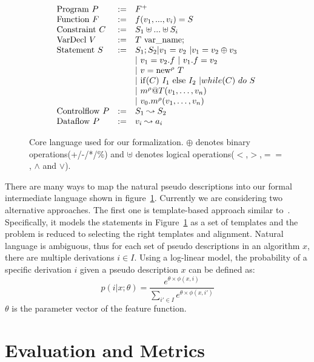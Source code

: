 \documentclass[11pt]{article}
\begin{document}
 \begin{figure}[t]
 \small
\[
\begin{array}{lll}
{\rm Program} \ P & := & F^+ \\
{\rm Function} \ F & := &  f(v_1,...,v_i) = S \\
{\rm Constraint} \ C & := & S_1 \uplus ... \uplus S_i \\
{\rm VarDecl} \ V & := & T \  {\rm var\_name}; \\
{\rm Statement} \ S & := & S_1;S_2 | v_1 = v_2 \ | v_1 = v_2 \oplus v_3 \ \\
& & | \ v_1 = v_2.f \ | \ v_1.f = v_2 \\
& & | \ v = {\rm new}^\rho \ T  \ \\
& & |  \ {\rm if}(C) \ I_1 \ {\rm else} \ I_2 \ | while(C) \ do \ S \ \\
& & | \ m^\rho@T(v_1, \ldots, v_n) \ \\
& & | \ v_0.m^\rho(v_1, \ldots, v_n) \\
{\rm Control flow} \ P & := & S_1 \leadsto S_2 \\
{\rm Data flow} \ P & := & v_i \leadsto a_i \\

\end{array}
\]
\vspace{-0.2in}
\caption{Core language used for our formalization. $\oplus$ denotes 
binary operations(+/-/*/\%) and $\uplus$ denotes logical 
operations($<$,$>$,$==$, $\land$ and $\lor$). }\label{fig:language}
\vspace{-0.1in}
\end{figure}
There are many ways to map the natural pseudo descriptions into our 
formal intermediate language shown in figure~\ref{fig:language}. 
Currently we are considering two alternative approaches. The first 
one is template-based approach similar to~\cite{word}. Specifically,  
it models the statements in Figure~\ref{fig:language} as a set of templates
and the problem is reduced to selecting the right templates and alignment.
Natural language is ambiguous, thus for each set of pseudo descriptions
in an algorithm $x$, there are multiple derivations $i\in I$. Using a 
log-linear model, the probability of a specific derivation $i$ given 
a pseudo description $x$ can be defined as:
\[
  p(i|x;\theta) = \frac{e^{\theta \times \phi(x,i)}}{\sum_{i'\in I}{e^{\theta \times \phi(x,i')}}}
\]
$\theta$ is the parameter vector of the feature function. 
\section{Evaluation and Metrics}
\end{document}
